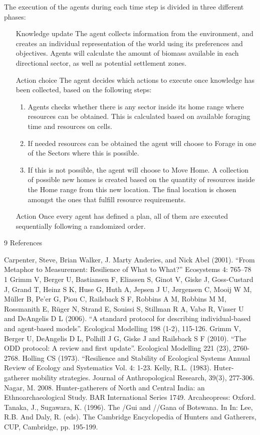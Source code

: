 The execution of the agents during each time step is divided in three different phases:
\begin{enumerate}[1.]
	\item[Knowledge update]
	The agent collects information from the environment, and creates an individual representation of the
	world using its preferences and objectives. Agents will calculate the amount of biomass available in
	each directional sector, as well as potential settlement zones.
	\item[Action choice]
	The agent decides which actions to execute once knowledge has been collected, based on the
	following steps:
	\begin{enumerate}
		\item Agents checks whether there is any sector inside its home range where resources can be
		obtained. This is calculated based on available foraging time and resources on cells.
		\item If needed resources can be obtained the agent will choose to Forage in one of the Sectors
		where this is possible.
		\item If this is not possible, the agent will choose to Move Home. A collection of possible new homes
		is created based on the quantity of resources inside the Home range from this new location.
		The final location is chosen amongst the ones that fulfill resource requirements.
	\end{enumerate}
	\item[Action]
	Once every agent has defined a plan, all of them are executed sequentially following a randomized
	order.
\end{enumerate}


9
References

Carpenter, Steve, Brian Walker, J. Marty Anderies, and Nick Abel (2001). “From Metaphor to Measurement:
Resilience of What to What?” Ecosystems 4: 765–78 1
Grimm V, Berger U, Bastiansen F, Eliassen S, Ginot V, Giske J, Goss-Custard J, Grand T, Heinz S K, Huse G, Huth A,
Jepsen J U, Jørgensen C, Mooij W M, Müller B, Pe’er G, Piou C, Railsback S F, Robbins A M, Robbins M M,
Rossmanith E, Rüger N, Strand E, Souissi S, Stillman R A, Vabø R, Visser U and DeAngelis D L (2006). “A standard
protocol for describing individual-based and agent-based models”. Ecological Modelling 198 (1-2), 115-126.
Grimm V, Berger U, DeAngelis D L, Polhill J G, Giske J and Railsback S F (2010). “The ODD protocol: A review and
first update”. Ecological Modelling 221 (23), 2760-2768.
Holling CS (1973). “Resilience and Stability of Ecological Systems Annual Review of Ecology and Systematics Vol. 4:
1-23.
Kelly, R.L. (1983). Huter-gatherer mobility strategies. Journal of Anthropological Research, 39(3), 277-306.
Nagar, M. 2008. Hunter-gatherers of North and Central India: an Ethnoarchaeological Study. BAR International Series
1749. Arcaheopress: Oxford.
Tanaka, J., Sugawara, K. (1996). The /Gui and //Gana of Botswana. In In: Lee, R.B. And Daly, R. (eds). The
Cambridge Encyclopedia of Hunters and Gatherers, CUP, Cambridge, pp. 195-199.












